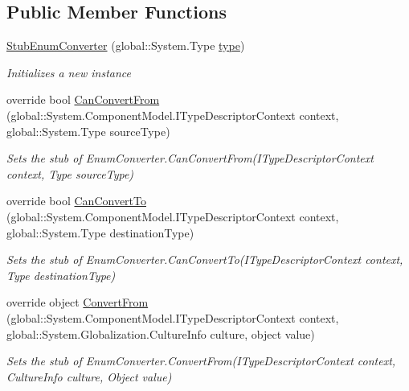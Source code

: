 \subsection*{Public Member Functions}
\begin{DoxyCompactItemize}
\item 
\hyperlink{class_system_1_1_component_model_1_1_fakes_1_1_stub_enum_converter_a122b9d814e815f1d48b7553afd3607e7}{Stub\-Enum\-Converter} (global\-::\-System.\-Type \hyperlink{jquery-1_810_82-vsdoc_8js_a3940565e83a9bfd10d95ffd27536da91}{type})
\begin{DoxyCompactList}\small\item\em Initializes a new instance\end{DoxyCompactList}\item 
override bool \hyperlink{class_system_1_1_component_model_1_1_fakes_1_1_stub_enum_converter_a8a282bc0006e472b24b7cb9ddfa9b5cf}{Can\-Convert\-From} (global\-::\-System.\-Component\-Model.\-I\-Type\-Descriptor\-Context context, global\-::\-System.\-Type source\-Type)
\begin{DoxyCompactList}\small\item\em Sets the stub of Enum\-Converter.\-Can\-Convert\-From(\-I\-Type\-Descriptor\-Context context, Type source\-Type)\end{DoxyCompactList}\item 
override bool \hyperlink{class_system_1_1_component_model_1_1_fakes_1_1_stub_enum_converter_ad2b7df852f75018e8ba858ace2a428e9}{Can\-Convert\-To} (global\-::\-System.\-Component\-Model.\-I\-Type\-Descriptor\-Context context, global\-::\-System.\-Type destination\-Type)
\begin{DoxyCompactList}\small\item\em Sets the stub of Enum\-Converter.\-Can\-Convert\-To(\-I\-Type\-Descriptor\-Context context, Type destination\-Type)\end{DoxyCompactList}\item 
override object \hyperlink{class_system_1_1_component_model_1_1_fakes_1_1_stub_enum_converter_a08ae269986a90da63ed9fe63907c08df}{Convert\-From} (global\-::\-System.\-Component\-Model.\-I\-Type\-Descriptor\-Context context, global\-::\-System.\-Globalization.\-Culture\-Info culture, object value)
\begin{DoxyCompactList}\small\item\em Sets the stub of Enum\-Converter.\-Convert\-From(\-I\-Type\-Descriptor\-Context context, Culture\-Info culture, Object value)\end{DoxyCompactList}\item 

\end{DoxyCompactItemize}
